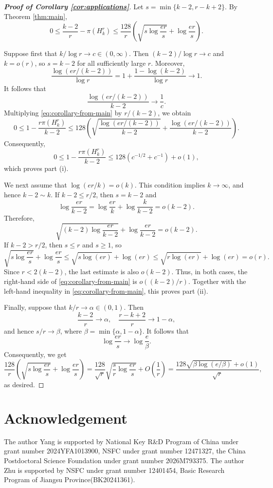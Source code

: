 \documentclass[12pt,a4paper]{article}
\numberwithin{equation}{section}
\theoremstyle{definition}
\theoremstyle{remark}
\begin{document}
\begin{proof}[\bfseries{Proof of Corollary \ref{cor:applications}}]
Let $s=\min\{k-2,r-k+2\}$.
By Theorem \ref{thm:main},
\begin{equation}\label{eq:corollary-from-main}
0\le \frac{k-2}{r}-\pi(H_k^r)
\le \frac{128}{r}
\left(
\sqrt{s\log\frac{er}{s}}
+\log\frac{er}{s}
\right).
\end{equation}

Suppose first that $k/\log r\to c\in(0,\infty)$. 
Then $(k-2)/\log r\to c$ and $k=o(r)$, so $s=k-2$ for all sufficiently large $r$. 
Moreover,
$$\frac{\log(er/(k-2))}{\log r}=1+\frac{1-\log(k-2)}{\log r}\longrightarrow 1.$$
It follows that
$$\frac{\log(er/(k-2))}{k-2}\longrightarrow \frac1c.$$
Multiplying \eqref{eq:corollary-from-main} by $r/(k-2)$, we obtain
$$0\le1-\frac{r\pi(H_k^r)}{k-2}\le128\left(\sqrt{\frac{\log(er/(k-2))}{k-2}}+\frac{\log(er/(k-2))}{k-2}\right).$$
Consequently,
$$0\le 1-\frac{r\pi(H_k^r)}{k-2}\le 128\left(c^{-1/2}+c^{-1}\right)+o(1),$$
which proves part \textup{(i)}.

We next assume that $\log(er/k)=o(k)$. 
This condition implies $k\to\infty$, and hence $k-2\sim k$. 
If $k-2\le r/2$, then $s=k-2$ and
$$\log\frac{er}{k-2}=\log\frac{er}{k}+\log\frac{k}{k-2}=o(k-2).$$
Therefore,
$$\sqrt{(k-2)\log\frac{er}{k-2}}+\log\frac{er}{k-2}=o(k-2).$$
If $k-2>r/2$, then $s\le r$ and $s\ge1$, so
$$\sqrt{s\log\frac{er}{s}}+\log\frac{er}{s}
\le \sqrt{s\log(er)}+\log(er)
\le \sqrt{r\log(er)}+\log(er)=o(r).$$
Since $r<2(k-2)$, the last estimate is also $o(k-2)$.
Thus, in both cases, the right-hand side of
\eqref{eq:corollary-from-main} is $o((k-2)/r)$. Together with the
left-hand inequality in \eqref{eq:corollary-from-main}, this proves
part \textup{(ii)}.

Finally, suppose that $k/r\to\alpha\in(0,1)$. 
Then
$$\frac{k-2}{r}\longrightarrow\alpha,
\quad
\frac{r-k+2}{r}\longrightarrow1-\alpha,$$
and hence $s/r\to\beta$, where $\beta=\min\{\alpha,1-\alpha\}$. 
It follows that
$$\log\frac{er}{s}\longrightarrow\log\frac e\beta.$$
Consequently, we get 
$$
\frac{128}{r} \left(\sqrt{s\log\frac{er}{s}}+\log\frac{er}{s}\right)
=\frac{128}{\sqrt r}\sqrt{\frac{s}{r}\log\frac{er}{s}}+O\left(\frac1r\right)
=\frac{128\sqrt{\beta\log(e/\beta)}+o(1)}{\sqrt r},$$
as desired.
\end{proof}


\section*{Acknowledgement}
\noindent The author Yang is supported by National Key R\&D Program of China under grant number 2024YFA1013900, 
NSFC under grant number 12471327, the China Postdoctoral Science Foundation under grant number 2026M793375.
The author Zhu is supported by NSFC under grant number 12401454, Basic Research Program of Jiangsu Province(BK20241361).
\end{document}
